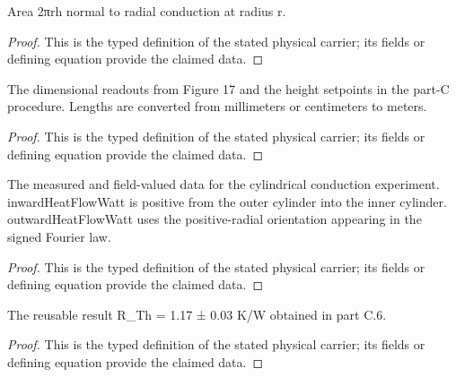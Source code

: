 \begin{definition}
  \label{def:physics:IPhO_2026_4_C_7:aux015}
  Area 2πrh normal to radial conduction at radius r.
\end{definition}
\begin{proof}
  This is the typed definition of the stated physical carrier; its fields or defining equation provide the claimed data.
\end{proof}

\begin{definition}
  \label{def:physics:IPhO_2026_4_C_7:aux016}
  The dimensional readouts from Figure 17 and the height setpoints in the part-C procedure. Lengths are converted from millimeters or centimeters to meters.
\end{definition}
\begin{proof}
  This is the typed definition of the stated physical carrier; its fields or defining equation provide the claimed data.
\end{proof}

\begin{definition}
  \label{def:physics:IPhO_2026_4_C_7:aux017}
  The measured and field-valued data for the cylindrical conduction experiment. inwardHeatFlowWatt is positive from the outer cylinder into the inner cylinder. outwardHeatFlowWatt uses the positive-radial orientation appearing in the signed Fourier law.
\end{definition}
\begin{proof}
  This is the typed definition of the stated physical carrier; its fields or defining equation provide the claimed data.
\end{proof}

\begin{definition}
  \label{def:physics:IPhO_2026_4_C_7:aux018}
  The reusable result R\_Th = 1.17 ± 0.03 K/W obtained in part C.6.
\end{definition}
\begin{proof}
  This is the typed definition of the stated physical carrier; its fields or defining equation provide the claimed data.
\end{proof}

